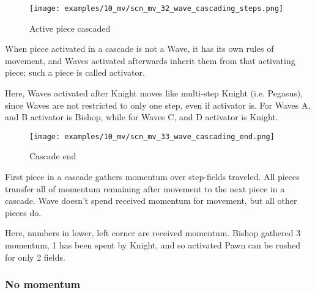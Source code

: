 \clearpage %

\vspace*{-2.1\baselineskip}
\noindent
\begin{figure}[h]
\texttt{[image: examples/10\_mv/scn\_mv\_32\_wave\_cascading\_steps.png]}
\vspace*{-1.4\baselineskip}
\caption{Active piece cascaded}
\label{fig:scn_mv_32_wave_cascading_steps}
\end{figure}

\vspace*{-0.4\baselineskip}
When piece activated in a cascade is not a Wave, it has its own rules of movement, and
Waves activated afterwards inherit them from that activating piece; such a piece is
called activator.

Here, Waves activated after Knight moves like multi-step Knight (i.e. Pegasus), since
Waves are not restricted to only one step, even if activator is. For Waves A, and B
activator is Bishop, while for Waves C, and D activator is Knight.

\clearpage %

\vspace*{-2.1\baselineskip}
\noindent
\begin{figure}[h]
\texttt{[image: examples/10\_mv/scn\_mv\_33\_wave\_cascading\_end.png]}
\vspace*{-1.3\baselineskip}
\caption{Cascade end}
\label{fig:scn_mv_33_wave_cascading_end}
\end{figure}

\vspace*{-0.3\baselineskip}
First piece in a cascade gathers momentum over step-fields traveled. All pieces
transfer all of momentum remaining after movement to the next piece in a cascade.
Wave doesn't spend received momentum for movement, but all other pieces do.

Here, numbers in lower, left corner are received momentum. Bishop gathered 3 momentum,
1 has been spent by Knight, and so activated Pawn can be rushed for only 2 fields.

\clearpage %

\subsubsection*{No momentum}
\label{sec:Miranda's veil/Wave/Cascading Waves/No momentum}

